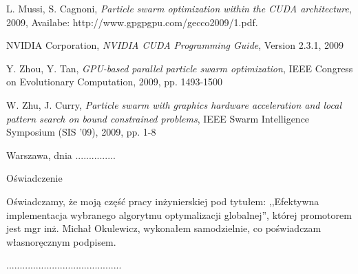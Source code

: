 \documentclass[12pt, twoside, openany, abstract=on]{report}
\theoremstyle{definition}
\begin{document}
\begin{thebibliography}{11}
 L. Mussi, S. Cagnoni, \emph{Particle swarm optimization within the CUDA architecture}, 2009, Availabe: http://www.gpgpgpu.com/gecco2009/1.pdf.

 NVIDIA Corporation, \emph{NVIDIA CUDA Programming Guide}, Version 2.3.1, 2009

 Y. Zhou, Y. Tan, \emph{GPU-based parallel particle swarm optimization}, IEEE Congress on Evolutionary Computation, 2009, pp. 1493-1500

 W. Zhu, J. Curry, \emph{Particle swarm with graphics hardware acceleration and local pattern search on bound constrained problems}, IEEE Swarm Intelligence Symposium (SIS '09), 2009, pp. 1-8

\end{thebibliography}
\clearpage
\pagestyle{empty}
\noindent Warszawa, dnia ...............
\vspace{5cm}
\begin{center}
\LARGE{Oświadczenie}
\end{center}
Oświadczamy, że moją część pracy inżynierskiej pod tytułem: ,,Efektywna implementacja wybranego algorytmu optymalizacji globalnej'', której promotorem jest mgr inż. Michał Okulewicz, wykonałem samodzielnie, co poświadczam własnoręcznym podpisem.
\vspace{2cm}
\begin{flushright}
...........................................
\end{flushright}
\end{document}
